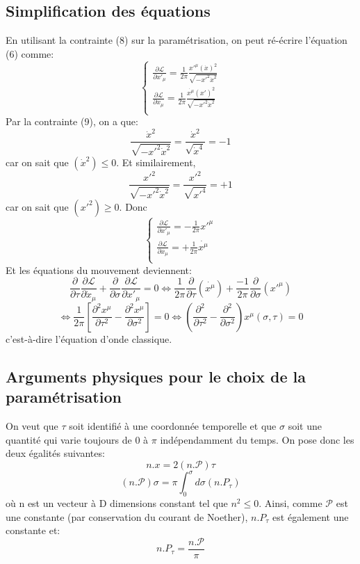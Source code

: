 \documentclass[a4paper,12pt]{article}
\def\xmu{x^\mu}
\def\CP{\mathcal{P}}
\def\CL{\mathcal{L}}
\begin{document}
\subsection{Simplification des équations}
En utilisant la contrainte (8) sur la paramétrisation, on peut ré-écrire l'équation (6) comme:
\begin{equation}
	\left\lbrace
	\begin{aligned}
	\frac{\partial \CL}{\partial x'_\mu }=\frac{1}{2\pi}\frac{x'^\mu (\dot{x})^2}{\sqrt{-x'^2\dot{x}^2}}\\
	\frac{\partial \CL}{\partial \dot{x_\mu}}=\frac{1}{2\pi}\frac{\dot{\xmu} (x')^2}{\sqrt{-x'^2\dot{x}^2}}\\
	\end{aligned}
	\right.
\end{equation}
Par la contrainte (9), on a que:
$$\frac{\dot{x}^2}{\sqrt{-x'^2\dot{x}^2}}=\frac{\dot{x}^2}{\sqrt{\dot{x}^4}}=-1$$ car on sait que $(\dot{x}^2)\leq0$.
Et similairement,
$$\frac{x'^2}{\sqrt{-x'^2\dot{x}^2}}=\frac{x'^2}{\sqrt{x'^4}}=+1$$
car on sait que $(x'^2)\geq0$.
Donc
\begin{equation}
	\left\lbrace
	\begin{aligned}
	\frac{\partial \CL}{\partial x'_\mu }=-\frac{1}{2\pi}x'^\mu\\
	\frac{\partial \CL}{\partial \dot{x_\mu}}=+\frac{1}{2\pi}\dot{\xmu}\\
	\end{aligned}
	\right.
\end{equation}
Et les équations du mouvement deviennent:
$$\frac{\partial}{\partial \tau}\frac{\partial \CL}{\partial \dot x_{\mu}}+\frac{\partial}{\partial \sigma}\frac{\partial \CL}{\partial  x'_{\mu}}=0 \Leftrightarrow \frac{1}{2\pi}\frac{\partial}{\partial \tau}\left( \dot{\xmu}\right)+\frac{-1}{2\pi}\frac{\partial}{\partial \sigma}\left( x'^\mu\right) $$
$$\Leftrightarrow \frac{1}{2\pi}\left[ \frac{\partial^2 x^\mu}{\partial \tau^2}-\frac{\partial^2 x^\mu}{\partial \sigma^2}\right] =0 \Leftrightarrow \left( \frac{\partial^2}{\partial \tau^2}-\frac{\partial^2 }{\partial \sigma^2}\right) \xmu(\sigma,\tau)=0$$
c'est-à-dire l'équation d'onde classique.
\subsection{Arguments physiques pour le choix de la paramétrisation}
On veut que $\tau$ soit identifié à une coordonnée temporelle et que $\sigma$ soit une quantité qui varie toujours de $0$ à $\pi$ indépendamment du temps.
On pose donc les deux égalités suivantes:
$$n.x=2(n.\mathcal{P})\tau$$
$$(n.\mathcal{P})\sigma=\pi\int_0^\sigma d\sigma (n.P_\tau)$$
où n est un vecteur à D dimensions constant tel que $n^2\leq0$.
Ainsi, comme $\CP$ est une constante (par conservation du courant de Noether), 
$n.P_\tau$ est également une constante et:
$$n.P_\tau=\frac{n.\mathcal{P}}{\pi}$$\\
\end{document}
